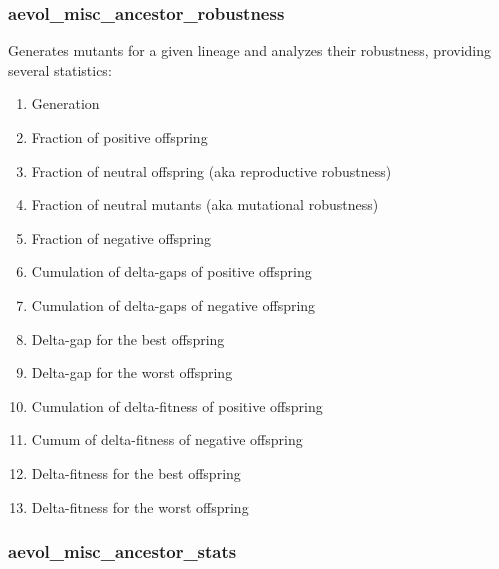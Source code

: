 \subsubsection{aevol\_misc\_ancestor\_robustness}
Generates mutants for a given lineage and analyzes their robustness, providing several statistics:
\begin{enumerate}
	
	\item Generation 
	\item Fraction of positive offspring 
	\item Fraction of neutral offspring (aka reproductive robustness) 
	\item Fraction of neutral mutants (aka mutational robustness) 
	\item Fraction of negative offspring 
	\item Cumulation of delta-gaps of positive offspring
	\item Cumulation of delta-gaps of negative offspring
	\item Delta-gap for the best offspring 
	\item Delta-gap for the worst offspring 
	\item Cumulation of delta-fitness of positive offspring 
	\item Cumum of delta-fitness of negative offspring
	\item Delta-fitness for the best offspring
	\item Delta-fitness for the worst offspring
\end{enumerate}


\subsubsection{aevol\_misc\_ancestor\_stats}

